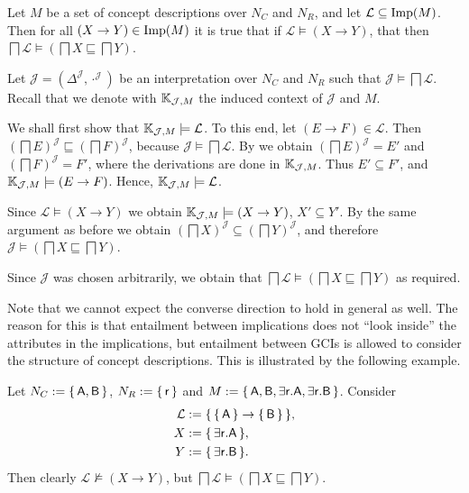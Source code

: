 \begin{Lemma}
  \label{lem:implicational-entailment-implies-gci-entailment}
  Let $M$ be a set of concept descriptions over $N_C$ and $N_R$, and let $\mathcal{L}
  \subseteq \operatorname{Imp}(M)$.  Then for all $(X \to Y) \in \operatorname{Imp}(M)$ it is true that if
  $\mathcal{L} \models (X \to Y)$, that then $\bigsqcap \mathcal{L} \models (\bigsqcap X
  \sqsubseteq \bigsqcap Y)$.
\end{Lemma}
\begin{Proof}
  Let $\mathcal{J} = (\Delta^{\mathcal{J}}, \cdot^{\mathcal{J}})$ be an interpretation
  over $N_C$ and $N_R$ such that $\mathcal{J} \models \bigsqcap \mathcal{L}$.  Recall that
  we denote with ${\mathbb{K}}_{\mathcal{J}, M}$ the induced context of $\mathcal{J}$ and $M$.
  
  We shall first show that ${\mathbb{K}}_{\mathcal{J}, M} \models \mathcal{L}$.  To this end,
  let $(E \to F) \in \mathcal{L}$.  Then $(\bigsqcap E)^{\mathcal{J}} \sqsubseteq
  (\bigsqcap F)^{\mathcal{J}}$, because $\mathcal{J} \models \bigsqcap \mathcal{L}$.  By
   we obtain $(\bigsqcap E)^{\mathcal{J}} = E'$ and
  $(\bigsqcap F)^{\mathcal{J}} = F'$, where the derivations are done in ${\mathbb{K}}_{\mathcal{J}, M}$.  Thus $E' \subseteq F'$, and ${\mathbb{K}}_{\mathcal{J}, M} \models (E
  \to F)$.  Hence, ${\mathbb{K}}_{\mathcal{J}, M} \models \mathcal{L}$.

  Since $\mathcal{L} \models (X \to Y)$ we obtain ${\mathbb{K}}_{\mathcal{J}, M} \models (X \to
  Y)$, \ie $X' \subseteq Y'$.  By the same argument as before we obtain $(\bigsqcap
  X)^{\mathcal{J}} \subseteq (\bigsqcap Y)^{\mathcal{J}}$, and therefore $\mathcal{J}
  \models (\bigsqcap X \sqsubseteq \bigsqcap Y)$.

  Since $\mathcal{J}$ was chosen arbitrarily, we obtain that $\bigsqcap \mathcal{L}
  \models (\bigsqcap X \sqsubseteq \bigsqcap Y)$ as required.
\end{Proof}

Note that we cannot expect the converse direction to hold in general as well.  The reason
for this is that entailment between implications does not ``look inside'' the attributes
in the implications, but entailment between GCIs is allowed to consider the structure of
concept descriptions.  This is illustrated by the following example.

\begin{Example}
  \label{expl:gci-entailment-does-not-impliy-implicational-entailment}
  Let $N_C := {\{\, \mathsf{A}, \mathsf{B} \,\}}$, $N_R := {\{\, \mathsf{r} \,\}}$ and $M := {\{\,
    \mathsf{A}, \mathsf{B}, \mathsf{\exists r. A}, \mathsf{\exists r. B} \,\}}$.  Consider
  \begin{align*}
    \mathcal{L} &:= {\{\, {\{\, \mathsf{A} \,\}} \to {\ensuremath{\{\, \mathsf{B} \,\}}} \,\}}, \\
    X &:= {\{\, \mathsf{\exists r. A} \,\}}, \\
    Y &:= {\{\, \mathsf{\exists r. B} \,\}}.
  \end{align*}
  Then clearly $\mathcal{L} \not\models (X \to Y)$, but $\bigsqcap \mathcal{L} \models
  (\bigsqcap X \sqsubseteq \bigsqcap Y)$.
\end{Example}

